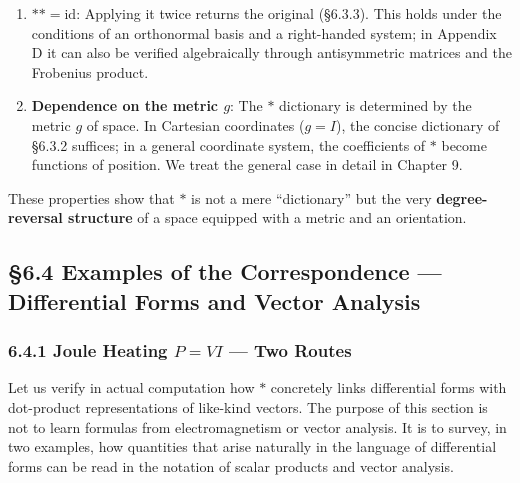 \documentclass[a4paper,12pt,openany]{book}
\begin{document}
\begin{enumerate}
\def\labelenumi{\arabic{enumi}.}
\setcounter{enumi}{3}
\item
  \textbf{$\ast\ast = \mathrm{id}$}: Applying it twice returns the
  original (§6.3.3). This holds under the conditions of an orthonormal
  basis and a right-handed system; in Appendix D it can also be verified
  algebraically through antisymmetric matrices and the Frobenius
  product.
\item
  \textbf{Dependence on the metric $g$}: The \(\ast\) dictionary is
  determined by the metric \(g\) of space. In Cartesian coordinates
  (\(g=I\)), the concise dictionary of §6.3.2 suffices; in a general
  coordinate system, the coefficients of \(\ast\) become functions of
  position. We treat the general case in detail in Chapter 9.
\end{enumerate}

These properties show that \(\ast\) is not a mere ``dictionary'' but the
very \textbf{degree-reversal structure} of a space equipped with a
metric and an orientation.

\par\vspace{0.35em}\par

\hypertarget{examples-of-the-correspondence-differential-forms-and-vector-analysis}{%
\subsection{§6.4 Examples of the Correspondence — Differential Forms
and Vector
Analysis}\label{examples-of-the-correspondence-differential-forms-and-vector-analysis}}

\hypertarget{joule-heating-pvi-two-routes}{%
\subsubsection{\texorpdfstring{6.4.1 Joule Heating \(P=VI\) — Two
Routes}{6.4.1 Joule Heating P=VI — Two Routes}}\label{joule-heating-pvi-two-routes}}

Let us verify in actual computation how \(\ast\) concretely links
differential forms with dot-product representations of like-kind
vectors. The purpose of this section is not to learn formulas from
electromagnetism or vector analysis. It is to survey, in two examples,
how quantities that arise naturally in the language of differential
forms can be read in the notation of scalar products and vector
analysis.
\end{document}
